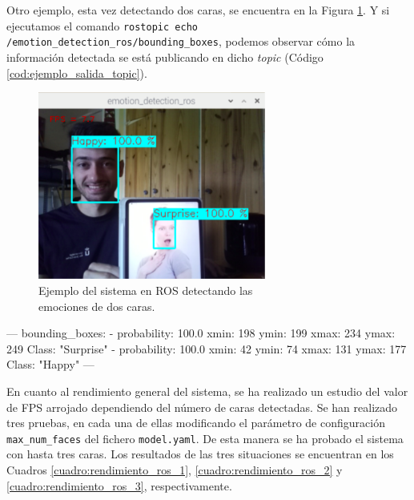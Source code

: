 Otro ejemplo, esta vez detectando dos caras, se encuentra en la Figura \ref{fig:ventana_grafica_2_caras}. Y si ejecutamos el comando \verb|rostopic echo /emotion_detection_ros/bounding_boxes|, podemos observar cómo la información detectada se está publicando en dicho \textit{topic} (Código \ref{cod:ejemplo_salida_topic}).\\

\begin{figure} [h!]
  \begin{center}
    \includegraphics[width=75mm]{figs/prediccion_happy_surprise.png}
  \end{center}
  \captionsetup{justification=centering}
  \caption{Ejemplo del sistema en ROS detectando las\\
  emociones de dos caras.}
  \label{fig:ventana_grafica_2_caras}
\end{figure}

\begin{code}[h]
\begin{listing}[style=consola, numbers=none]
---
bounding_boxes:
    -
        probability: 100.0
        xmin: 198
        ymin: 199
        xmax: 234
        ymax: 249
        Class: "Surprise"
    -
        probability: 100.0
        xmin: 42
        ymin: 74
        xmax: 131
        ymax: 177
        Class: "Happy"
---
\end{listing}
\captionsetup{justification=centering}
\caption[Información publicada en el \textit{topic} /emotion\_detection\_ros/bounding\_boxes para el ejemplo de la Figura \ref{fig:ventana_grafica_2_caras}.]{Ejemplo de información publicada en el \textit{topic} /emotion\_detection\_ros/bounding\_boxes para el ejemplo de la Figura \ref{fig:ventana_grafica_2_caras}.}
\label{cod:ejemplo_salida_topic}
\end{code}

En cuanto al rendimiento general del sistema, se ha realizado un estudio del valor de FPS arrojado dependiendo del número de caras detectadas. Se han realizado tres pruebas, en cada una de ellas modificando el parámetro de configuración \verb|max_num_faces| del fichero \verb|model.yaml|. De esta manera se ha probado el sistema con hasta tres caras. Los resultados de las tres situaciones se encuentran en los Cuadros \ref{cuadro:rendimiento_ros_1}, \ref{cuadro:rendimiento_ros_2} y \ref{cuadro:rendimiento_ros_3}, respectivamente.\\

